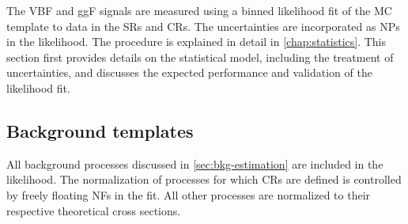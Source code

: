 
The VBF and ggF signals are measured using a binned likelihood fit of the MC template to data in the SRs and CRs. The uncertainties are incorporated as NPs in the likelihood. The procedure is explained in detail in \cref{chap:statistics}. 
This section first provides details on the statistical model, including the treatment of uncertainties, and discusses the expected performance and validation of the likelihood fit.


\subsection{Background templates}
All background processes discussed in \cref{sec:bkg-estimation} are included in the likelihood. 
The normalization of processes for which CRs are defined is controlled by freely floating NFs in the fit. All other processes are normalized to their respective theoretical cross sections.

